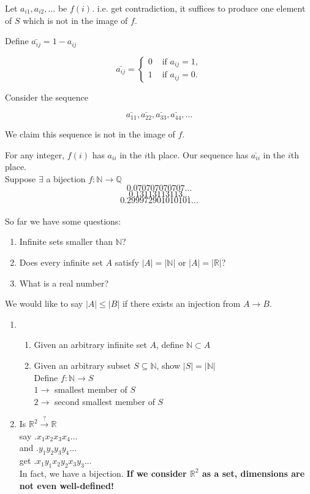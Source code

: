 \documentclass[a4paper, 11pt, twoside]{article}
\begin{document}
Let $a_{i1}, a_{i2},\dots$ be $f(i)$. i.e. get contradiction, it suffices to produce one element of $S$ which is not in the image of $f$.

Define $\bar{a_{ij}}=1-a_{ij}$

\[
\bar{a_{ij}}=
\begin{cases}
	0 & \text{ if } a_{ij}=1,\\
	1 & \text{ if } a_{ij}=0.
\end{cases}
\]

Consider the sequence

\[\bar{a_{11}}, \bar{a_{22}}, \bar{a_{33}}, \bar{a_{44}}, \dots\]

We claim this sequence is not in the image of $f$.

For any integer, $f(i)$ has $a_{ii}$ in the $i$th place. Our sequence has $\bar{a_{ii}}$ in the $i$th place.\\

Suppose $\exists$ a bijection $f:\mathbb{N}\to\mathbb{Q}$\\

\[0.070707070707\dots\]
\[0.13113113113\dots\]
\[0.299972901010101\dots\]\\

So far we have some questions:
\begin{enumerate}
	\item Infinite sets smaller than $\mathbb{N}$?
	\item Does every infinite set $A$ satisfy $|A|=|\mathbb{N}|$ or $|A|=|\mathbb{R}|$?
	\item What is a real number?\\
\end{enumerate}

We would like to say $|A|\leq |B|$ if there exists an injection from $A\to B$.\\

\begin{enumerate}
	\item \begin{enumerate}
		\item Given an arbitrary infinite set $A$, define $\mathbb{N}\subset A$
		\item Given an arbitrary subset $S \subseteq \mathbb{N}$, show $|S| = |\mathbb{N}|$\\
		Define $f:\mathbb{N}\to S$\\
		$1\to$ smallest member of $S$\\
		$2\to$ second smallest member of $S$\\
	\end{enumerate}
	\item Is $\mathbb{R}^2 \overset{?}\to \mathbb{R}$\\
	say $.x_1x_2x_3x_4\dots$\\
	and $.y_1y_2y_3y_4\dots$\\
	get $.x_1y_1x_2y_2x_3y_3\dots$\\
	In fact, we have a bijection. \textbf{If we consider $\mathbb{R}^2$ as a set, dimensions are not even well-defined!}\\
\end{enumerate}
\end{document}
